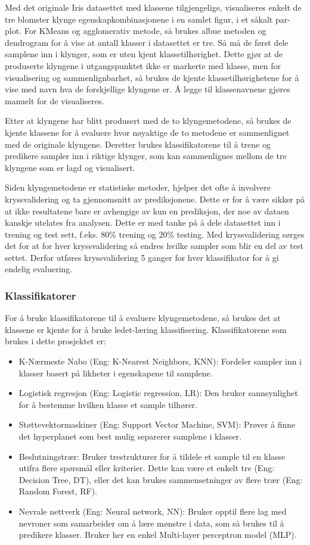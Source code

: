 \documentclass[twocolumn,norwegian]{article}
\begin{document}
	Med det originale Iris datasettet med klassene tilgjengelige, visualiseres enkelt de tre blomster klynge egenskapkombinasjonene i en samlet figur, i et såkalt par-plot. For KMeans og agglomerativ metode, så brukes albue metoden og dendrogram for å vise at antall klasser i datasettet er tre. Så må de først dele samplene inn i klynger, som er uten kjent klassetilhørighet. Dette gjør at de produserte klyngene i utgangspunktet ikke er markerte med klasse, men for visualisering og sammenlignbarhet, så brukes de kjente klassetilhørighetene for å vise med navn hva de forskjellige klyngene er. Å legge til klassenavnene gjøres manuelt for de visualiseres.
	
	Etter at klyngene har blitt produsert med de to klyngemetodene, så brukes de kjente klassene for å evaluere hvor nøyaktige de to metodene er sammenlignet med de originale klyngene. Deretter brukes klassifikatorene til å trene og predikere sampler inn i riktige klynger, som kan sammenlignes mellom de tre klyngene som er lagd og  visualisert.
	
	Siden klyngemetodene er statistiske metoder, hjelper det ofte å involvere kryssvalidering og ta gjennomsnitt av prediksjonene. Dette er for å være sikker på at ikke resultatene bare er avhengige av kun en prediksjon, der noe av dataen kanskje utelates fra analysen. Dette er med tanke på å dele datasettet inn i trening og test sett, f.eks. 80\% trening og 20\% testing. Med kryssvalidering sørges det for at for hver kryssvalidering så endres hvilke sampler som blir en del av test settet. Derfor utføres kryssvalidering 5 ganger for hver klassifikator for å gi endelig evaluering.
	
	
	\subsubsection{Klassifikatorer}
	For å bruke klassifikatorene til å evaluere klyngemetodene, så brukes det at klassene er kjente for å bruke ledet-læring klassifisering. Klassifikatorene som brukes i dette prosjektet er:
	\begin{itemize}
		\item K-Nærmeste Nabo (Eng: K-Nearest Neighbors, KNN): Fordeler sampler inn i klasser basert på likheter i egenskapene til samplene.
		\item Logistisk regresjon (Eng: Logistic regression, LR): Den bruker sannsynlighet for å bestemme hvilken klasse et sample tilhører.
		\item Støttevektormaskiner (Eng: Support Vector Machine, SVM): Prøver å finne det hyperplanet som best mulig separerer samplene i klasser.
		\item Beslutningstrær: Bruker trestrukturer for å tildele et sample til en klasse utifra flere spørsmål eller kriterier. Dette kan være et enkelt tre (Eng: Decision Tree, DT), eller det kan brukes sammensetninger av flere trær (Eng: Random Forest, RF).
		\item Nevrale nettverk (Eng: Neural network, NN): Bruker opptil flere lag med nevroner som samarbeider om å lære mønstre i data, som så brukes til å predikere klasser. Bruker her en enkel Multi-layer perceptron model (MLP).
	\end{itemize}
	
\end{document}
